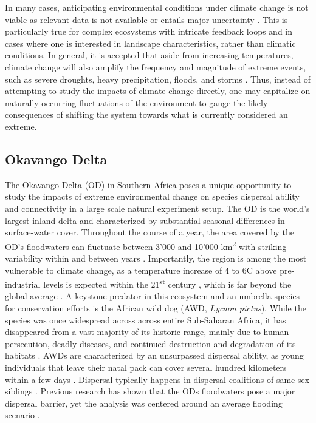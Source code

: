\documentclass[abstract=on,10pt,a4paper,bibliography=totocnumbered]{article}
\begin{document}
In many cases, anticipating environmental conditions under climate change is not
viable as relevant data is not available or entails major uncertainty
\citep{Collins.2012}. This is particularly true for complex ecosystems with
intricate feedback loops and in cases where one is interested in landscape
characteristics, rather than climatic conditions. In general, it is accepted
that aside from increasing temperatures, climate change will also amplify the
frequency and magnitude of extreme events, such as severe droughts, heavy
precipitation, floods, and storms \citep{Stott.2016, Ummenhofer.2017,
IPCC.2022}. Thus, instead of attempting to study the impacts of climate change
directly, one may capitalize on naturally occurring fluctuations of the
environment to gauge the likely consequences of shifting the system towards what
is currently considered an extreme.

\subsection{Okavango Delta}
The Okavango Delta (OD) in Southern Africa poses a unique opportunity to study
the impacts of extreme environmental change on species dispersal ability and
connectivity in a large scale natural experiment setup. The OD is the world's
largest inland delta and characterized by substantial seasonal differences in
surface-water cover. Throughout the course of a year, the area covered by the
OD's floodwaters can fluctuate between 3'000 and 10'000 km\textsuperscript{2}
with striking variability within and between years \citep{Gumbricht.2004,
Wolski.2017}. Importantly, the region is among the most vulnerable to climate
change, as a temperature increase of 4 to 6\degree C above pre-industrial levels
is expected within the 21\textsuperscript{st} century \citep{Engelbrecht.2015,
Akinyemi.2019}, which is far beyond the global average \citep{IPCC.2022}. A
keystone predator in this ecosystem and an umbrella species for conservation
efforts is the African wild dog (AWD, \textit{Lycaon pictus}). While the species
was once widespread across across entire Sub-Saharan Africa, it has disappeared
from a vast majority of its historic range, mainly due to human persecution,
deadly diseases, and continued destruction and degradation of its habitats
\citep{Woodroffe.2012}. AWDs are characterized by an unsurpassed dispersal
ability, as young individuals that leave their natal pack can cover several
hundred kilometers within a few days \citep{Davies-Mostert.2012, Masenga.2016,
Cozzi.2020}. Dispersal typically happens in dispersal coalitions of same-sex
siblings  \citep{McNutt.1996}. Previous research has shown that the ODs
floodwaters pose a major dispersal barrier, yet the analysis was centered around
an average flooding scenario \citep{Hofmann.2021}.
\end{document}
